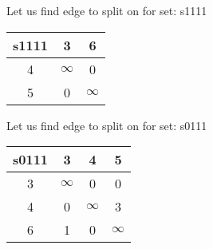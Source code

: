 \documentclass[a4paper,10pt]{report} %
\begin{document}
\newpage


Let us find edge to split on for set: s1111\\
\begin{flushleft}\begin{tabular}[]{|c|c|c|}
\hline
s1111 & 3 & 6\\
\hline
4 & $\infty$ &      0\\
\hline
5 &      0 & $\infty$\\
\hline
\end{tabular}
\end{flushleft}



\newpage


Let us find edge to split on for set: s0111\\
\begin{flushleft}\begin{tabular}[]{|c|c|c|c|}
\hline
s0111 & 3 & 4 & 5\\
\hline
3 & $\infty$ &      0 &      0\\
\hline
4 &      0 & $\infty$ &      3\\
\hline
6 &      1 &      0 & $\infty$\\
\hline
\end{tabular}
\end{flushleft}


\begin{table}[ht]
\hfill
{}
\end{table}
\end{document}
